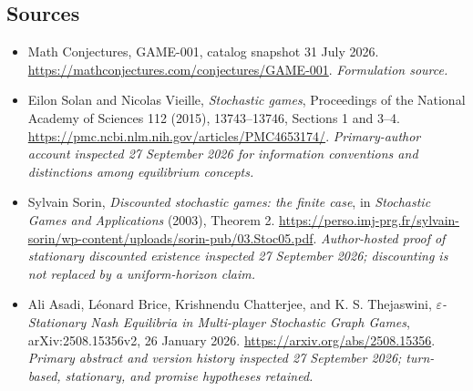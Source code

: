 \documentclass[11pt]{article}
\begin{document}
\subsection{Sources}
\begin{itemize}
\item[S1]Math Conjectures, GAME-001, catalog snapshot 31 July 2026.
\url{https://mathconjectures.com/conjectures/GAME-001}.
\textit{Formulation source.}
\item[E1]Eilon Solan and Nicolas Vieille, \emph{Stochastic games},
Proceedings of the National Academy of Sciences 112 (2015), 13743--13746,
Sections 1 and 3--4.
\url{https://pmc.ncbi.nlm.nih.gov/articles/PMC4653174/}.
\textit{Primary-author account inspected 27 September 2026 for
information conventions and distinctions among equilibrium concepts.}
\item[E2]Sylvain Sorin, \emph{Discounted stochastic games: the finite case},
in \emph{Stochastic Games and Applications} (2003), Theorem 2.
\url{https://perso.imj-prg.fr/sylvain-sorin/wp-content/uploads/sorin-pub/03.Stoc05.pdf}.
\textit{Author-hosted proof of stationary discounted existence inspected
27 September 2026; discounting is not replaced by a uniform-horizon claim.}
\item[E3]Ali Asadi, L\'eonard Brice, Krishnendu Chatterjee, and
K. S. Thejaswini, \emph{$\varepsilon$-Stationary Nash Equilibria in
Multi-player Stochastic Graph Games}, arXiv:2508.15356v2,
26 January 2026.
\url{https://arxiv.org/abs/2508.15356}.
\textit{Primary abstract and version history inspected 27 September 2026;
turn-based, stationary, and promise hypotheses retained.}

\end{itemize}
\end{document}
